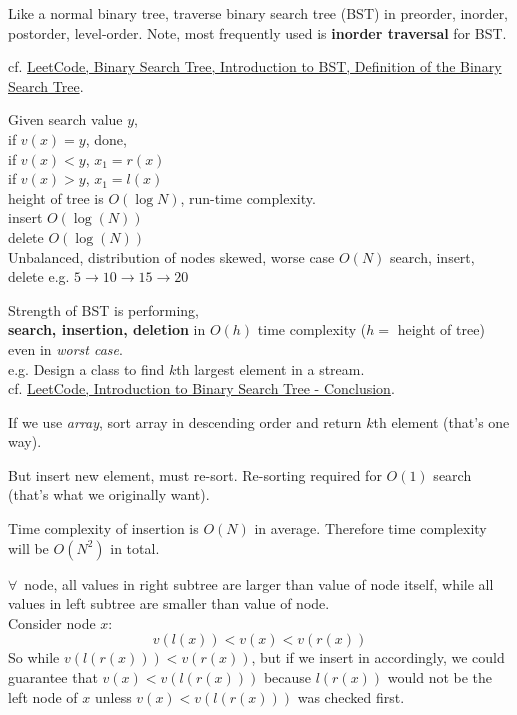 \documentclass[10pt]{amsart}
\begin{document}
Like a normal binary tree, traverse binary search tree (BST) in preorder, inorder, postorder, level-order. Note, most frequently used is \textbf{inorder traversal} for BST. 

cf. \href{https://leetcode.com/explore/learn/card/introduction-to-data-structure-binary-search-tree/140/introduction-to-a-bst/1017/}{LeetCode, Binary Search Tree, Introduction to BST, Definition of the Binary Search Tree}.


Given search value $y$, \\
if $v(x) = y$, done, \\
if $v(x) < y$, $x_1 = r(x)$ \\
if $v(x) > y$, $x_1= l(x)$ \\

height of tree is $O(\log{N})$, run-time complexity. \\
insert $O(\log{(N)})$ \\
delete $O(\log{(N)})$ \\

Unbalanced, distribution of nodes skewed, worse case $O(N)$ search, insert, delete e.g. $5 \to 10 \to 15 \to 20$

Strength of BST is performing, \\
\textbf{search, insertion, deletion} in $O(h)$ time complexity ($h = $ height of tree) even in \emph{worst case}. \\

e.g. Design a class to find $k$th largest element in a stream. \\

cf. \href{https://leetcode.com/explore/learn/card/introduction-to-data-structure-binary-search-tree/142/conclusion/1009/}{LeetCode, Introduction to Binary Search Tree - Conclusion}. 

If we use \emph{array}, sort array in descending order and return $k$th element (that's one way).  

But insert new element, must re-sort. Re-sorting required for $O(1)$ search (that's what we originally want).

Time complexity of insertion is $O(N)$ in average. Therefore time complexity will be $O(N^2)$ in total.

$\forall \, $ node, all values in right subtree are larger than value of node itself, while all values in left subtree are smaller than value of node. \\
Consider node $x$:
\[
v(l(x)) < v(x) < v(r(x))
\]
So while $v(l(r(x))) < v(r(x))$, but if we insert in accordingly, we could guarantee that $v(x) < v(l(r(x)))$ because $l(r(x))$ would not be the left node of $x$ unless $v(x) < v(l(r(x)))$ was checked first.
\end{document}
